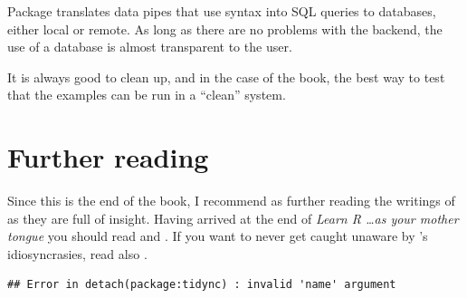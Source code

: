 \documentclass[krantz2]{krantz}\usepackage{knitr}
\begin{document}
\begin{explainbox}
Package  translates data pipes that use  syntax into SQL queries to databases, either local or remote. As long as there are no problems with the backend, the use of a database is almost transparent to the \Rlang user.
\end{explainbox}

\begin{infobox}
It is always good to clean up, and in the case of the book, the best way to test that the examples
can be run in a ``clean'' system.

\begin{knitrout}\footnotesize
{}\color{fgcolor}\begin{kframe}
\begin{alltt}
\hlstd{(}\hlstd{,}  \hlstd{=} \hlstd{)}
\hlstd{(}\hlstd{,}  \hlstd{=} \hlstd{)}
\end{alltt}
\end{kframe}
\end{knitrout}
\end{infobox}

\section{Further reading}
Since this is the end of the book, I recommend as further reading the writings of \citeauthor{Burns1998} as they are full of insight. Having arrived at the end of \emph{Learn R \ldots as your mother tongue} you should read  \autocite{Burns1998} and  \autocite{Burns2012}. If you want to never get caught unaware by \Rlang's idiosyncrasies, read also  \autocite{Burns2011}.

\begin{knitrout}\footnotesize
{}\color{fgcolor}\begin{kframe}
\begin{verbatim}
## Error in detach(package:tidync) : invalid 'name' argument
\end{verbatim}
\end{kframe}
\end{knitrout}



\backmatter

\printbibliography

\printindex

\printindex[rcatsidx]

\printindex[rindex]
\end{document}
